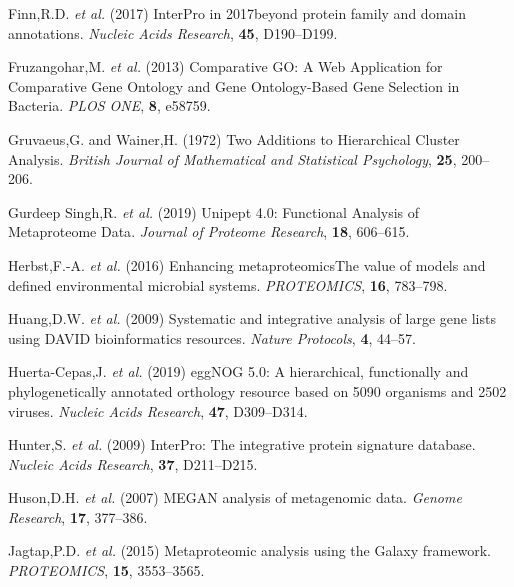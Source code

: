 \begin{CSLReferences}{1}{0}
\leavevmode\hypertarget{ref-finnInterPro2017Protein2017}{}%
Finn,R.D. \emph{et al.} (2017) {InterPro} in 2017{}beyond protein family
and domain annotations. \emph{Nucleic Acids Research}, \textbf{45},
D190--D199.

\leavevmode\hypertarget{ref-fruzangoharComparativeGOWeb2013}{}%
Fruzangohar,M. \emph{et al.} (2013) Comparative {GO}: {A Web
Application} for {Comparative Gene Ontology} and {Gene Ontology-Based
Gene Selection} in {Bacteria}. \emph{PLOS ONE}, \textbf{8}, e58759.

\leavevmode\hypertarget{ref-gruvaeusTwoAdditionsHierarchical1972}{}%
Gruvaeus,G. and Wainer,H. (1972) Two {Additions} to {Hierarchical
Cluster Analysis}{}. \emph{British Journal of Mathematical and
Statistical Psychology}, \textbf{25}, 200--206.

\leavevmode\hypertarget{ref-gurdeepsinghUnipeptFunctionalAnalysis2019}{}%
Gurdeep Singh,R. \emph{et al.} (2019) Unipept 4.0: {Functional Analysis}
of {Metaproteome Data}. \emph{Journal of Proteome Research},
\textbf{18}, 606--615.

\leavevmode\hypertarget{ref-herbstEnhancingMetaproteomicsValue2016}{}%
Herbst,F.-A. \emph{et al.} (2016) Enhancing metaproteomics{{The}} value
of models and defined environmental microbial systems.
\emph{PROTEOMICS}, \textbf{16}, 783--798.

\leavevmode\hypertarget{ref-huangSystematicIntegrativeAnalysis2009}{}%
Huang,D.W. \emph{et al.} (2009) Systematic and integrative analysis of
large gene lists using {DAVID} bioinformatics resources. \emph{Nature
Protocols}, \textbf{4}, 44--57.

\leavevmode\hypertarget{ref-huerta-cepasEggNOGHierarchicalFunctionally2019}{}%
Huerta-Cepas,J. \emph{et al.} (2019) {eggNOG} 5.0: A hierarchical,
functionally and phylogenetically annotated orthology resource based on
5090 organisms and 2502 viruses. \emph{Nucleic Acids Research},
\textbf{47}, D309--D314.

\leavevmode\hypertarget{ref-hunterInterProIntegrativeProtein2009}{}%
Hunter,S. \emph{et al.} (2009) {InterPro}: The integrative protein
signature database. \emph{Nucleic Acids Research}, \textbf{37},
D211--D215.

\leavevmode\hypertarget{ref-husonMEGANAnalysisMetagenomic2007}{}%
Huson,D.H. \emph{et al.} (2007) {MEGAN} analysis of metagenomic data.
\emph{Genome Research}, \textbf{17}, 377--386.

\leavevmode\hypertarget{ref-jagtapMetaproteomicAnalysisUsing2015}{}%
Jagtap,P.D. \emph{et al.} (2015) Metaproteomic analysis using the
{Galaxy} framework. \emph{PROTEOMICS}, \textbf{15}, 3553--3565.


\end{CSLReferences}
